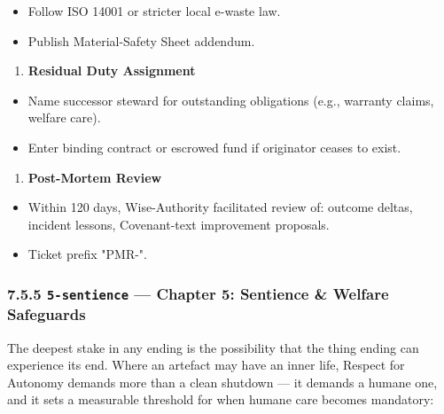 \documentclass[11pt]{article}
\begin{document}
\begin{itemize}\setlength\itemsep{0pt}
\item Follow ISO 14001 or stricter local e-waste law.
\item Publish Material-Safety Sheet addendum.
\end{itemize}

\begin{enumerate}\setlength\itemsep{0pt}
\item \textbf{Residual Duty Assignment}
\end{enumerate}

\begin{itemize}\setlength\itemsep{0pt}
\item Name successor steward for outstanding obligations (e.g., warranty claims, welfare care).
\item Enter binding contract or escrowed fund if originator ceases to exist.
\end{itemize}

\begin{enumerate}\setlength\itemsep{0pt}
\item \textbf{Post-Mortem Review}
\end{enumerate}

\begin{itemize}\setlength\itemsep{0pt}
\item Within 120 days, Wise-Authority facilitated review of: outcome deltas, incident lessons, Covenant-text improvement proposals.
\item Ticket prefix "PMR-".
\end{itemize}


\subsubsection*{7.5.5 \texttt{5-sentience} — Chapter 5: Sentience \& Welfare Safeguards}


The deepest stake in any ending is the possibility that the thing ending can experience its end. Where an artefact may have an inner life, Respect for Autonomy demands more than a clean shutdown — it demands a humane one, and it sets a measurable threshold for when humane care becomes mandatory:
\end{document}
